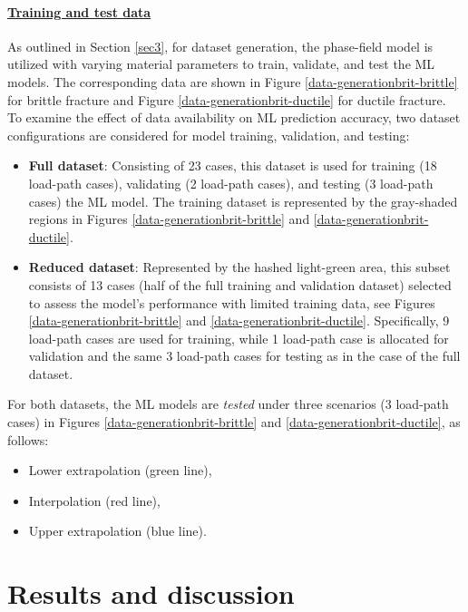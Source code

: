 \documentclass[final,3p,times]{elsarticle}
\begin{document}
\paragraph*{\underline{\textbf{Training and test data}}}
%
As outlined in Section \ref{sec3}, for dataset generation, the phase-field model is utilized with varying material parameters to train, validate, and test the ML models. The corresponding data are shown in Figure \ref{data-generationbrit-brittle} for brittle fracture and Figure \ref{data-generationbrit-ductile} for ductile fracture. To examine the effect of data availability on ML prediction accuracy, two dataset configurations are considered for model training, validation, and testing:
\begin{itemize}
\item \textbf{Full dataset}: Consisting of 23 cases, this dataset is used for training (18 load-path cases), validating (2 load-path cases), and testing (3 load-path cases) the ML model. The training dataset is represented by the gray-shaded regions in Figures \ref{data-generationbrit-brittle} and \ref{data-generationbrit-ductile}.

\item \textbf{Reduced dataset}: Represented by the hashed light-green area, this subset consists of 13 cases (half of the full training and validation dataset) selected to assess the model's performance with limited training data, see Figures \ref{data-generationbrit-brittle} and \ref{data-generationbrit-ductile}. {Specifically, 9 load-path cases are used for training, while 1 load-path case is allocated for validation and the same 3 load-path cases for testing as in the case of the full dataset.}

\end{itemize}
For both datasets, the ML models are {\it tested} under three scenarios (3 load-path cases) in Figures \ref{data-generationbrit-brittle} and \ref{data-generationbrit-ductile}, as follows: 
\begin{itemize}
\item Lower extrapolation (green line),
\item Interpolation (red line),
\item Upper extrapolation (blue line).
\end{itemize}








\section{Results and discussion}
\label{sec5}
\end{document}
